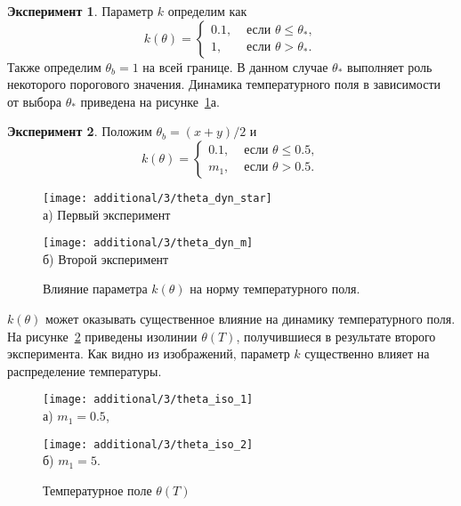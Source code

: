 \textbf{Эксперимент 1}.
Параметр $k$ определим как
\[
    k(\theta)=
    \begin{cases}
        0.1, & \text { если } \theta \leq \theta_{*}, \\
        1, & \text { если } \theta>\theta_{*}.
    \end{cases}
\]
Также определим $\theta_b = 1$ на всей границе.
В данном случае $\theta_{*}$ выполняет роль некоторого порогового значения.
Динамика температурного поля в зависимости от выбора $\theta_*$ приведена
на рисунке~\ref{fig:4_1:theta_dyn_diff}а.



\textbf{Эксперимент 2}.
Положим $\theta_b = (x + y) /2$ и
\[
    k(\theta)=
    \begin{cases}
        0.1, & \text { если } \theta \leq 0.5, \\
        m_1, & \text { если } \theta > 0.5.
    \end{cases}
\]

\begin{figure}[h!t]
    \begin{minipage}[b][][b]{0.49\linewidth}
        \centering
        \texttt{[image: additional/3/theta\_dyn\_star]} \\ а) Первый эксперимент
    \end{minipage}
    \hfill
    \begin{minipage}[b][][b]{0.49\linewidth}
        \centering
        \texttt{[image: additional/3/theta\_dyn\_m]} \\ б) Второй эксперимент
    \end{minipage}
    \caption{Влияние параметра $k(\theta)$ на норму температурного поля.}
    \label{fig:4_1:theta_dyn_diff}
\end{figure}

$k(\theta)$ может оказывать существенное влияние на динамику температурного поля.
На рисунке~\ref{fig:4_1:theta_iso_2exp} приведены изолинии $\theta(T)$,
получившиеся в результате второго эксперимента.
Как видно из изображений, параметр $k$ существенно влияет на распределение температуры.
\begin{figure}[h!t]
    \begin{minipage}[b][][b]{0.49\linewidth}
        \centering
        \texttt{[image: additional/3/theta\_iso\_1]} \\ а) $m_1 = 0.5$,
    \end{minipage}
    \hfill
    \begin{minipage}[b][][b]{0.49\linewidth}
        \centering
        \texttt{[image: additional/3/theta\_iso\_2]} \\ б) $m_1 = 5$.
    \end{minipage}
    \caption{Температурное поле $\theta(T)$}
    \label{fig:4_1:theta_iso_2exp}
\end{figure}


